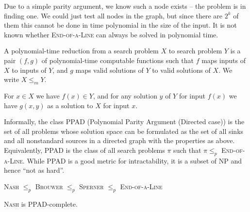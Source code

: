 Due to a simple parity argument, we know such a node exists -- the problem is
in finding one. We could just test all nodes in the graph, but since there are
$2^k$ of them this cannot be done in time polynomial in the size of the input.
It is not known whether \textsc{End-of-a-Line} can always be solved in
polynomial time.

\begin{definition}
	A polynomial-time reduction from a search problem $X$ to search problem $Y$
	is a pair $(f,g)$ of polynomial-time computable functions such that $f$
	maps inputs of $X$ to inputs of $Y$, and $g$ maps valid solutions of $Y$ to
	valid solutions of $X$. We write $X \le_m Y$.
\end{definition}

For $x \in X$ we have $f(x) \in Y$, and for any solution $y$ of $Y$ for input
$f(x)$ we have $g(x,y)$ as a solution to $X$ for input $x$.

Informally, the class PPAD (Polynomial Parity Argument (Directed case)) is the
set of all problems whose solution space can be formulated as the set of all
sinks and all nonstandard sources in a directed graph with the properties as
above. Equivalently, PPAD is the class of all search problems $\pi$ such that
$\pi \le_p$ \textsc{End-of-a-Line}. While PPAD is a good metric for
intractability, it is a subset of NP and hence ``not as hard''.

\begin{theorem}
	\textsc{Nash} $\le_p$ \textsc{Brouwer} $\le_p$ \textsc{Sperner} $\le_p$
	\textsc{End-of-a-Line}
\end{theorem}

\begin{theorem}[Goldberg, 2006]
	\textsc{Nash} is PPAD-complete.
\end{theorem}


